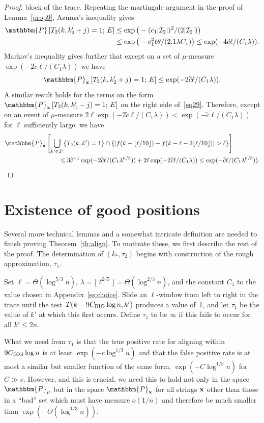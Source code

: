 \documentclass[final,12pt]{colt2018} %
\renewcommand{\P}{\mathbbm{P}}
\newcommand{\1}{\mathbf{1}}
\def\cI{\mathcal{I}}
\newcommand{\eqb}{\begin{equation}}
\newcommand{\eqe}{\end{equation}}
\newcommand{\eqbn}{\begin{equation*}}
\newcommand{\eqen}{\end{equation*}}
\newcommand{\wt}{\widetilde}
\def\x{{\bf x}}
\def\ct{{\wt c}}
\def\chuge{C_{\rm BIG}}
\begin{document}
\begin{proof}
	block of the trace.  Repeating the martingale argument in the
	proof of Lemma~\ref{prop9}, Azuma's inequality gives
	\eqb
	\begin{split}
		\P\left[ T_2(k,k_2'+j)=1;\,E\right]
		&\leq \exp\big( - (c_1|\cI_2|)^2/(2|\cI_2|)\big)\\
		&\leq \exp\big( -c^2_1 \ell\theta /(2.1\lambda C_1)\big)
		\leq \exp( -4\ct\ell/(C_1\lambda) ).
	\end{split}
	\label{eq32}
	\eqe
	Markov's inequality gives further that except on a set of
	$\mu$-measure $\exp( -2\ct\ell/(C_1\lambda) )$ we have
	$$ \P_\x\left[ T_2(k,k_2'+j)=1;\,E\right]
	\leq \exp( -2\ct\ell/(C_1\lambda) ).  $$
	A similar result holds for the terms on the form $\P_{\x} \left [
	T_2(k , k_1'-j) = 1; \, E \right ]$ on the right side of~\eqref{eq29}. Therefore, except on an event of $\mu$-measure $2 \ell \exp(
	-2 \ct \ell / (C_1\lambda) ) < \exp(-\ct \ell / (C_1\lambda))$ for $\ell$ sufficiently large, we have
	\eqbn
	\begin{split}
		\P_{\x}&\left[ \bigcup_{k' \in \cI'} \{T_2(k,k')=1\}
		\cap \{|f(k-\lfloor \ell/10 \rfloor) -
		f(k-\ell-2\lfloor \ell/10 \rfloor)| > \ell\} \right]\\
		&\qquad\leq 3\ct^{-1}\exp(-2\ct\ell/(C_1\lambda^{6/5}))
		+ 2\ell \exp( -2\ct\ell/(C_1\lambda) )
		\leq \exp(-\ct\ell/(C_1\lambda^{6/5}) ).
	\end{split}
	\eqen
\end{proof}


\section{Existence of good positions} \label{sec:find}

Several more technical lemmas and a somewhat intricate definition
are needed to finish proving Theorem~\ref{th:align}.  To motivate
these, we first describe the rest of the proof.  The determination
of $(k_* , \tau_2)$ begins with construction of the rough approximation,
$\tau_1$.

Set $\ell = \Theta (\log^{5/3} n)$, $\lambda = \lfloor\ell^{2/5}\rfloor =
\Theta (\log^{2/3} n)$, and the constant $C_1$ to the value
chosen in Appendix~\ref{ss:choice}.  Slide an $\ell$-window
from left to right in the trace until the test
$T(k - 9 \chuge \log n , k')$ produces a value of~1, and let $\tau_1$
be the value of $k'$ at which this first occurs.  Define $\tau_1$
to be $\infty$ if this fails to occur for all $k' \leq 2 n$.

What we need from $\tau_1$ is that the true positive rate for aligning
within $9 \chuge \log n$ is at least $\exp (-c \log^{1/3} n)$ and that
the false positive rate is at most a similar but smaller function of
the same form, $\exp (-C \log^{1/3} n)$ for $C \gg c$.  However, and
this is crucial, we need this to hold not only in the space $\P_\mu$
but in the space $\P_\x$ for all strings $\x$ other than those in a
``bad'' set which must have measure $o(1/n)$ and therefore be much
smaller than $\exp (- \Theta (\log^{1/3} n))$.
\end{document}
